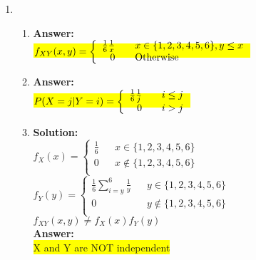\documentclass{article}
\newcommand{\myansw}{\textbf{Answer:}\\}
\newcommand{\mysolu}{\textbf{Solution:}\\}
\begin{document}
\begin{enumerate}
\begin{enumerate}
	\end{enumerate}
	\item
	\begin{enumerate}
		\item
		\myansw
		\colorbox{yellow}{${\mathlarger{f_{XY}(x,y) = \left\lbrace \begin{array}{rcl}\frac{1}{6} \frac{1}{x} & & x  \in \{1,2,3,4,5,6\}, y \leq x\\
					0 & & \text{Otherwise}\\
					\end{array}\right.}}$}\\
		\item
		\myansw
		\colorbox{yellow}{${\mathlarger{P(X = j|Y = i) = \left\lbrace \begin{array}{rcl}\frac{1}{6} \frac{1}{j} & & i \leq j\\
					0 & & i > j\\
					\end{array}\right.}}$}\\
		\item
		\mysolu
		${f_X(x) = \left\lbrace \begin{array}{rcl}\frac{1}{6} & & x \in \{1,2,3,4,5,6\}\\
			0 & & x\notin \{1,2,3,4,5,6\}\\
			\end{array}\right.}$\\
		${f_Y(y) = \left\lbrace \begin{array}{rcl}\frac{1}{6}\sum\limits_{i = y}^6 \frac{1}{y} & & y \in \{1,2,3,4,5,6\}\\
			0 & & y\notin \{1,2,3,4,5,6\}\\
			\end{array}\right.}$\\
		${f_{XY}(x,y) \neq f_X(x)f_Y(y)}$\\
		\myansw
		\colorbox{yellow}{X and Y are NOT independent}\\	
		

\end{enumerate}
\end{enumerate}
\end{document}
